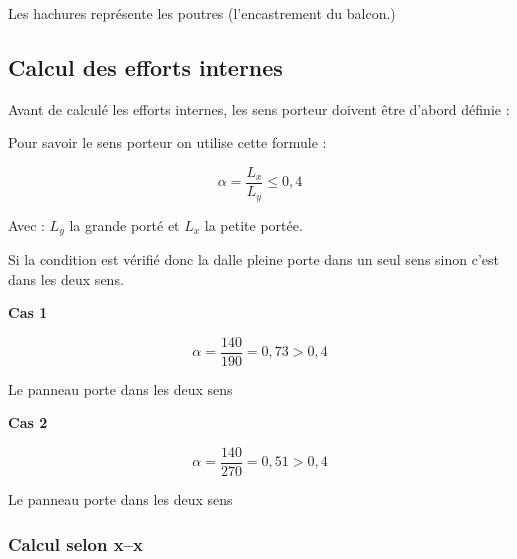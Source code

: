 	{\centering Les hachures représente les poutres (l'encastrement du balcon.)\par}
	
	
	\subsection{Calcul des efforts internes}
	
	Avant de calculé les efforts internes, les sens porteur doivent être d'abord définie :
	
	Pour savoir le sens porteur on utilise cette formule :
	
	\[ \alpha = \dfrac{L_{x}}{L_{y}} \leq 0,4 \]
	
	Avec : $L_{y}$ la grande porté et $L_{x}$ la petite portée.
	
	Si la condition est vérifié donc la dalle pleine porte dans un seul sens sinon c'est dans les deux sens.
	
	\vspace{\baselineskip}
	
	\textbf{Cas 1}
	
	\[ \alpha = \dfrac{140}{190} = 0,73 > 0,4 \]
	
	{\centering Le panneau porte dans les deux sens\par}
	
	\textbf{Cas 2}
	
	\[ \alpha = \dfrac{140}{270} = 0,51 > 0,4 \]
	
	{\centering Le panneau porte dans les deux sens\par }
	
	
	\subsubsection{Calcul selon x--x}
	
